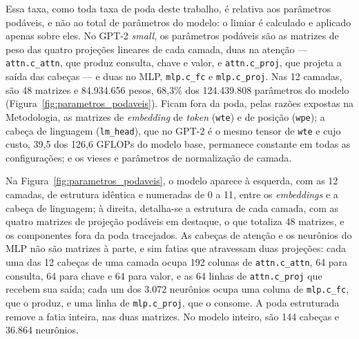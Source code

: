 Essa taxa, como toda taxa de poda deste trabalho, é relativa aos parâmetros podáveis, e não
ao total de parâmetros do modelo: o limiar é
calculado e aplicado apenas sobre eles. No GPT-2 \textit{small}, os parâmetros podáveis são
as matrizes de peso das quatro projeções lineares de cada camada, duas na atenção ---
\texttt{attn.c\_attn}, que produz consulta, chave e valor, e \texttt{attn.c\_proj}, que
projeta a saída das cabeças --- e duas no MLP, \texttt{mlp.c\_fc} e \texttt{mlp.c\_proj}.
Nas 12 camadas, são 48 matrizes e 84.934.656 pesos, 68,3\% dos 124.439.808 parâmetros do
modelo (Figura~\ref{fig:parametros_podaveis}). Ficam fora da poda, pelas razões expostas
na Metodologia, as matrizes de \textit{embedding} de \textit{token} (\texttt{wte}) e de
posição (\texttt{wpe}); a cabeça de linguagem (\texttt{lm\_head}), que no GPT-2 é o mesmo
tensor de \texttt{wte} e cujo custo, 39,5 dos 126,6 GFLOPs do modelo base, permanece
constante em todas as configurações; e os vieses e parâmetros de normalização de camada.

Na Figura~\ref{fig:parametros_podaveis}, o modelo aparece à esquerda, com as 12 camadas, de
estrutura idêntica e numeradas de 0 a 11, entre os \textit{embeddings} e a cabeça de
linguagem; à direita, detalha-se a estrutura de cada camada, com as quatro matrizes de
projeção podáveis em destaque, o que totaliza 48 matrizes, e os componentes fora da poda
tracejados. As cabeças de atenção e os neurônios do MLP não são matrizes à parte, e sim
fatias que atravessam duas projeções: cada uma das 12 cabeças de uma camada ocupa 192
colunas de \texttt{attn.c\_attn}, 64 para consulta, 64 para chave e 64 para valor, e as 64
linhas de \texttt{attn.c\_proj} que recebem sua saída; cada um dos 3.072 neurônios ocupa uma
coluna de \texttt{mlp.c\_fc}, que o produz, e uma linha de \texttt{mlp.c\_proj}, que o
consome. A poda estruturada remove a fatia inteira, nas duas matrizes. No modelo inteiro, são
144 cabeças e 36.864 neurônios.

